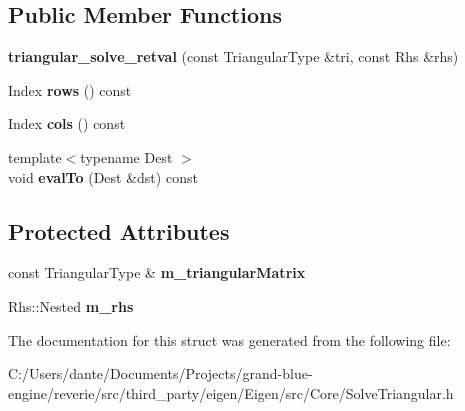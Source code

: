 \subsection*{Public Member Functions}
\begin{DoxyCompactItemize}
\item 
\mbox{\label{struct_eigen_1_1internal_1_1triangular__solve__retval_a4e4b85d79cca2b2e64501aa0f32c0e80}} 
{\bfseries triangular\+\_\+solve\+\_\+retval} (const Triangular\+Type \&tri, const Rhs \&rhs)
\item 
\mbox{\label{struct_eigen_1_1internal_1_1triangular__solve__retval_ae644694588f13a50fb555299ba67cc34}} 
Index {\bfseries rows} () const
\item 
\mbox{\label{struct_eigen_1_1internal_1_1triangular__solve__retval_a366175697be9a8f69045d159f98a6af9}} 
Index {\bfseries cols} () const
\item 
\mbox{\label{struct_eigen_1_1internal_1_1triangular__solve__retval_a1fef0f91ac77d9580219dd69fe952862}} 
{\footnotesize template$<$typename Dest $>$ }\\void {\bfseries eval\+To} (Dest \&dst) const
\end{DoxyCompactItemize}
\subsection*{Protected Attributes}
\begin{DoxyCompactItemize}
\item 
\mbox{\label{struct_eigen_1_1internal_1_1triangular__solve__retval_a0b94fe70c5a9bfaae888404f9fa7498d}} 
const Triangular\+Type \& {\bfseries m\+\_\+triangular\+Matrix}
\item 
\mbox{\label{struct_eigen_1_1internal_1_1triangular__solve__retval_ae537f77975204e1c1940c5162db71537}} 
Rhs\+::\+Nested {\bfseries m\+\_\+rhs}
\end{DoxyCompactItemize}


The documentation for this struct was generated from the following file\+:\begin{DoxyCompactItemize}
\item 
C\+:/\+Users/dante/\+Documents/\+Projects/grand-\/blue-\/engine/reverie/src/third\+\_\+party/eigen/\+Eigen/src/\+Core/Solve\+Triangular.\+h\end{DoxyCompactItemize}
